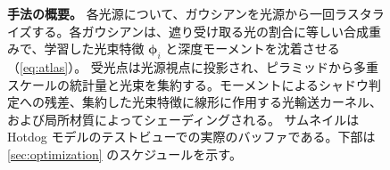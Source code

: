 \begin{figure}[t]
  \centering
  \resizebox{0.94\textwidth}{!}{}
  \caption{\textbf{手法の概要。}
各光源について、ガウシアンを光源から一回ラスタライズする。各ガウシアンは、遮り受け取る光の割合に等しい合成重みで、学習した光束特徴 $\boldsymbol\phi_i$ と深度モーメントを沈着させる（\cref{eq:atlas}）。
受光点は光源視点に投影され、ピラミッドから多重スケールの統計量と光束を集約する。モーメントによるシャドウ判定への残差、集約した光束特徴に線形に作用する光輸送カーネル、および局所材質によってシェーディングされる。
サムネイルは Hotdog モデルのテストビューでの実際のバッファである。下部は \cref{sec:optimization} のスケジュールを示す。}
  \label{fig:pipeline}
\end{figure}
